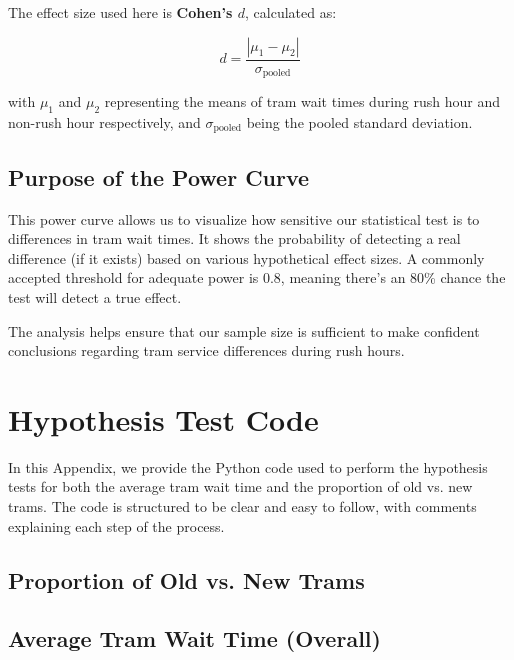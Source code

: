 \documentclass[a4paper, 10pt]{article}
\begin{document}
\begin{appendices}
				The effect size used here is \textbf{Cohen's \( d \)}, calculated as:

				\[
				d = \frac{|\mu_1 - \mu_2|}{\sigma_{\text{pooled}}}
				\]

				with \( \mu_1 \) and \( \mu_2 \) representing the means of tram wait times during rush hour and non-rush hour respectively, and \( \sigma_{\text{pooled}} \) being the pooled standard deviation.

			\subsection*{Purpose of the Power Curve}

				This power curve allows us to visualize how sensitive our statistical test is to differences in tram wait times. It shows the probability of detecting a real difference (if it exists) based on various hypothetical effect sizes. A commonly accepted threshold for adequate power is 0.8, meaning there's an 80\% chance the test will detect a true effect.

				\bigskip
				The analysis helps ensure that our sample size is sufficient to make confident conclusions regarding tram service differences during rush hours.
		

		\newpage
		\section{Hypothesis Test Code}
		\label{sec:hypothesis_test_code}
		  \noindent In this Appendix, we provide the Python code used to perform the hypothesis tests for both the average tram wait time and the proportion of old vs. new trams. The code is structured to be clear and easy to follow, with comments explaining each step of the process.

			\subsection*{Proportion of Old vs. New Trams}
					

			\newpage
			\subsection*{Average Tram Wait Time (Overall)}
				


\end{appendices}
\end{document}
